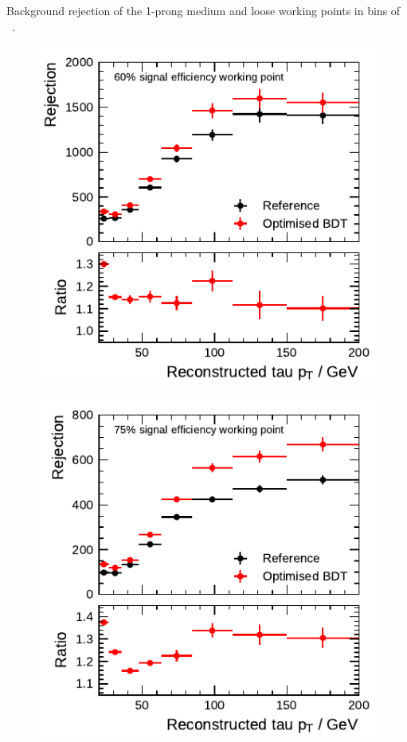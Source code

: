 \begin{minipage}{\textwidth}
\begin{subfigure}{0.48\textwidth}
  \end{subfigure}
  \caption[Background rejection of the 1-prong medium and loose working points
  in bins of \tauhadvis~\pt for the BDT-based identification]{Background
    rejection of the 1-prong medium and loose working points in bins of
    \tauhadvis~\pt.}
\end{minipage}

\noindent
\begin{minipage}{\textwidth}
  \captionsetup{type=figure}
  \begin{subfigure}{0.48\textwidth}
    \centering
    \includegraphics{./figures/bdt_perf/post_optimisation/rejection_medium_3p.pdf}
  \end{subfigure}\hfill
  \begin{subfigure}{0.48\textwidth}
    \centering
    \includegraphics{./figures/bdt_perf/post_optimisation/rejection_loose_3p.pdf}

\end{subfigure}
\end{minipage}
